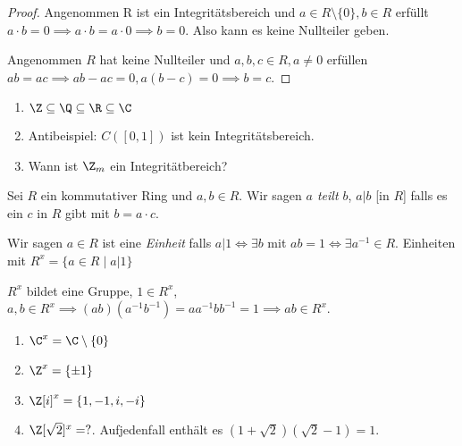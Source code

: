 \begin{proof}
	Angenommen R ist ein Integritätsbereich und $a \in R \setminus \{0\}, b \in R$ erfüllt $a\cdot b = 0 \implies a\cdot b = a\cdot 0 \implies b = 0$.
	Also kann es keine Nullteiler geben.

	Angenommen $R$ hat keine Nullteiler und $a,b,c \in R, a \neq 0$ erfüllen $ab = ac \implies ab - ac = 0, a(b-c) = 0 \implies b = c$.
\end{proof}

\begin{eg}
	\begin{enumerate}
		\item $\Z \subseteq \Q \subseteq \R \subseteq \C$ 
		\item Antibeispiel: $C([0,1])$ ist kein Integritätsbereich.
		\item Wann ist $\Z_{m}$ ein Integritätbereich?
	\end{enumerate}
\end{eg}

\begin{definition}
	Sei $R$ ein kommutativer Ring und  $a,b \in R$.
	Wir sagen \emph{$a$ teilt  $b$}, $a \vert b$ [in $R$] falls es ein $c$ in $R$ gibt mit $b = a \cdot c$.
\end{definition}

\begin{definition}
	Wir sagen $a \in R$ ist eine \emph{Einheit} falls $a \vert 1 \Leftrightarrow \exists b	$ mit $ab = 1 \Leftrightarrow \exists a^{-1} \in R$.
	Einheiten mit $R^{x} = \{a \in R \mid a \vert 1\} $
\end{definition}

\begin{remark}
	$R^{x}$ bildet eine Gruppe, $1 \in R^{x}$, $a,b \in R^{x} \implies (ab)(a^{-1} b^{-1}) = a a^{-1} b b^{-1} = 1 \implies a b \in R^{x}$.
\end{remark}

\begin{eg}
	\begin{enumerate}
		\item $\C^{x} = \C \setminus \{0\}$ 
		\item $\Z^{x} = \{\pm 1\}$ 
		\item $\Z[i]^{x} = \{1,-1, i, -i\} $ 
		\item $\Z[\sqrt{2}]^{x} = ?$. Aufjedenfall enthält es $(1+\sqrt{2})(\sqrt{2} -1) = 1$.
	\end{enumerate}
\end{eg}

